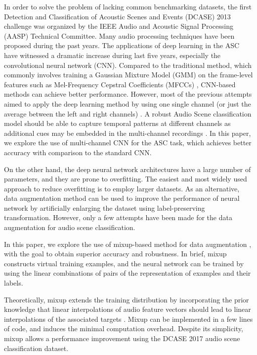 \documentclass[conference]{IEEEtran}
\begin{document}
In order to solve the problem of lacking common benchmarking datasets, the first Detection and Classification of Acoustic Scenes and Events (DCASE) 2013 challenge \cite{b2} was organized by the IEEE Audio and Acoustic Signal Processing (AASP) Technical Committee. Many audio processing techniques have been proposed during the past years. The applications of deep learning in the ASC have witnessed a dramatic increase during last five years, especially the convolutional neural network (CNN). Compared to the traditional method, which commonly involves training a Gaussian Mixture Model (GMM) on the frame-level features such as Mel-Frequency Cepstral Coefficients (MFCCs) \cite{b3}, CNN-based methods can achieve better performance. However, most of the previous attempts aimed to apply the deep learning method by using one single channel (or just the average between the left and right channels) \cite{b4}. A robust Audio Scene classification model should be able to capture temporal patterns at different channels as additional cues may be embedded in the multi-channel recordings \cite{b5}. In this paper, we explore the use of multi-channel CNN for the ASC task, which achieves better accuracy with comparison to the standard CNN.

On the other hand, the deep neural network architectures have a large number of parameters, and they are prone to overfitting. The easiest and most widely used approach to reduce overfitting is to employ larger datasets. As an alternative, data augmentation method can be used to improve the performance of neural network by artificially enlarging the dataset using label-preserving transformation. However, only a few attempts have been made for the data augmentation for audio scene classification.

In this paper, we explore the use of mixup-based method for data augmentation \cite{b6}, with the goal to obtain superior accuracy and robustness. In brief, mixup constructs virtual training examples, and the neural network can be trained by using the linear combinations of pairs of the representation of examples and their labels.

Theoretically, mixup extends the training distribution by incorporating the prior knowledge that linear interpolations of audio feature vectors should lead to linear interpolations of the associated targets \cite{b6}. Mixup can be implemented in a few lines of code, and induces the minimal computation overhead. Despite its simplicity, mixup allows a performance improvement using the DCASE 2017 audio scene classification dataset.
\end{document}
